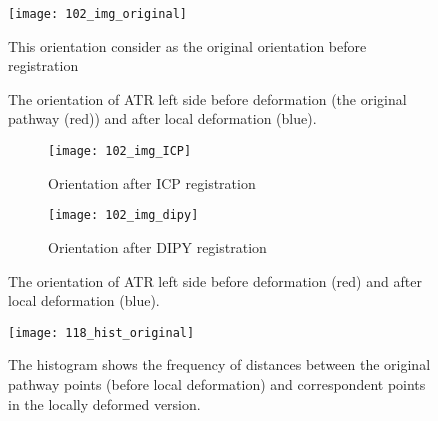 \documentclass[../structure.tex]{subfiles}
\begin{document}
\begin{figure}[H]
\centering
\texttt{[image: 102\_img\_original]}
\captionsetup{justification=centering}
\caption{The orientation of ATR left side before deformation (the original pathway (red)) and after local deformation (blue).}%
{This orientation consider as the original orientation before registration}
\label{fig:img_original_def}
\end{figure}

\begin{figure}[H]
	\centering
	\begin{subfigure}[b]{0.49\textwidth}
	\centering
	\texttt{[image: 102\_img\_ICP]}
	\caption{Orientation after ICP registration}
	\end{subfigure}
	\begin{subfigure}[b]{0.49\textwidth}
	\centering
	\texttt{[image: 102\_img\_dipy]}
	\caption{Orientation after DIPY registration}
	\end{subfigure}
\captionsetup{justification=centering}
\caption{The orientation of ATR left side before deformation (red) and after local deformation (blue).}
\label{fig:pca}
\end{figure}

\begin{comment}
\begin{figure}[H]
\centering
\texttt{[image: 102\_img\_ICP]}
\captionsetup{justification=centering}
\caption{The orientation of ATR left side before deformation (the original pathway (red)) and after local deformation (blue).}%
{This orientation is after applying ICP registration to correct the local deformation}
\label{fig:img_icp_def}
\end{figure}

\begin{figure}[H]
\centering
\texttt{[image: 102\_img\_dipy]}
\captionsetup{justification=centering}
\caption{The orientation of ATR left side before deformation (the original pathway (red)) and after local deformation (blue).}%
{This orientation is after applying DIPY registration to find the optimal alignment}
\label{fig:img_dipy_def}
\end{figure}
\end{comment}

\begin{figure}[H]
\centering
\texttt{[image: 118\_hist\_original]}
\captionsetup{justification=centering}
\caption{The histogram shows the frequency of distances between the original pathway points (before local deformation) and correspondent points in the locally deformed version.}
\label{fig:hist_original_def}
\end{figure}
\end{document}
